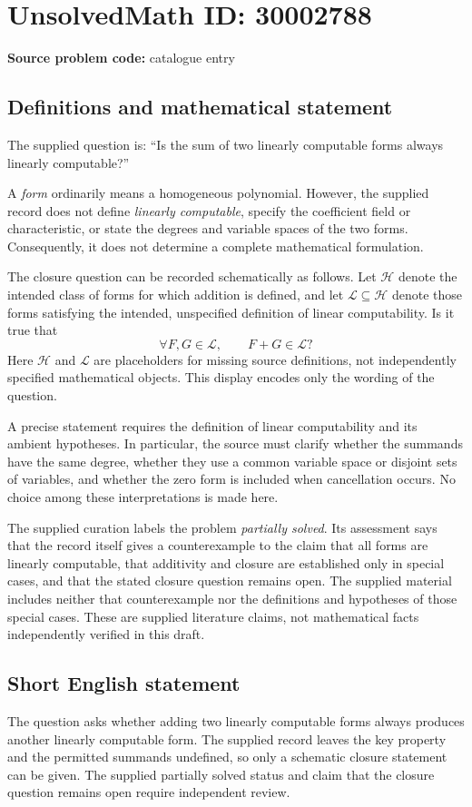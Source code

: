 \documentclass[11pt]{article}
\begin{document}
\section*{UnsolvedMath ID: 30002788}
\textbf{Source problem code:} catalogue entry
\subsection{Definitions and mathematical statement}
The supplied question is: ``Is the sum of two linearly computable forms always linearly computable?''

A \emph{form} ordinarily means a homogeneous polynomial. However, the supplied record does not define \emph{linearly computable}, specify the coefficient field or characteristic, or state the degrees and variable spaces of the two forms. Consequently, it does not determine a complete mathematical formulation.

The closure question can be recorded schematically as follows. Let \(\mathcal H\) denote the intended class of forms for which addition is defined, and let \(\mathcal L\subseteq\mathcal H\) denote those forms satisfying the intended, unspecified definition of linear computability. Is it true that
\[
\forall F,G\in\mathcal L,\qquad F+G\in\mathcal L?
\]
Here \(\mathcal H\) and \(\mathcal L\) are placeholders for missing source definitions, not independently specified mathematical objects. This display encodes only the wording of the question.

A precise statement requires the definition of linear computability and its ambient hypotheses. In particular, the source must clarify whether the summands have the same degree, whether they use a common variable space or disjoint sets of variables, and whether the zero form is included when cancellation occurs. No choice among these interpretations is made here.

The supplied curation labels the problem \emph{partially solved}. Its assessment says that the record itself gives a counterexample to the claim that all forms are linearly computable, that additivity and closure are established only in special cases, and that the stated closure question remains open. The supplied material includes neither that counterexample nor the definitions and hypotheses of those special cases. These are supplied literature claims, not mathematical facts independently verified in this draft.
\subsection{Short English statement}
The question asks whether adding two linearly computable forms always produces another linearly computable form. The supplied record leaves the key property and the permitted summands undefined, so only a schematic closure statement can be given. The supplied partially solved status and claim that the closure question remains open require independent review.
\end{document}
